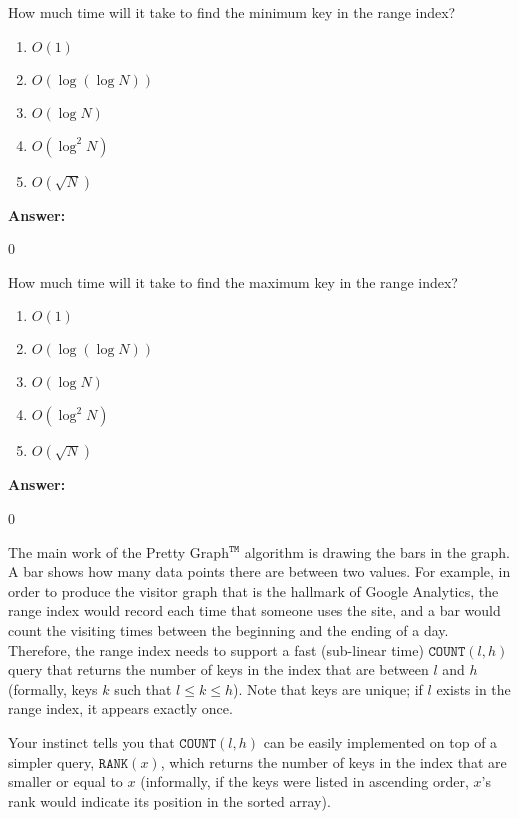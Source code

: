 \documentclass[12pt,twoside]{article}
\newcommand{\answer}{
 \par\medskip
 \textbf{Answer:}
}
\newcommand{\answerIc}{ \answer
0
}
\newcommand{\answerId}{ \answer
0
}
\begin{document}
\begin{problems}
\begin{problemparts}
  \problempart {} How much time will it take to find the minimum key in
  the range index?
    \begin{enumerate}
      \item $O(1)$
      \item $O(\log(\log N))$
      \item $O(\log N)$
      \item $O(\log^2 N)$
      \item $O(\sqrt{N})$
    \end{enumerate}
\answerIc 

  \problempart {} How much time will it take to find the maximum key in
  the range index?
    \begin{enumerate}
      \item $O(1)$
      \item $O(\log(\log N))$
      \item $O(\log N)$
      \item $O(\log^2 N)$
      \item $O(\sqrt{N})$
    \end{enumerate}
\answerId

\end{problemparts}

The main work of the Pretty Graph$^{\texttt{TM}}$ algorithm is drawing the bars in the
graph. A bar shows how many data points there are between two values. For example,
in order to produce the visitor graph that is the hallmark of Google Analytics, the
range index would record each time that someone uses the site, and a bar would count
the visiting times between the beginning and the ending of a day. Therefore, the
range index needs to support a fast (sub-linear time) $\texttt{COUNT}(l, h)$ query
that returns the number of keys in the index that are between $l$ and $h$
(formally, keys $k$ such that $l \leq k \leq h$). Note that keys are unique; if $l$
exists in the range index, it appears exactly once.

Your instinct tells you that $\texttt{COUNT}(l, h)$ can be easily implemented on top
of a simpler query, $\texttt{RANK}(x)$, which returns the number of keys in
the index that are smaller or equal to $x$ (informally, if the keys were listed in
ascending order, $x$'s rank would indicate its position in the sorted array).

\begin{problemparts}


\end{problemparts}
\end{problems}
\end{document}

